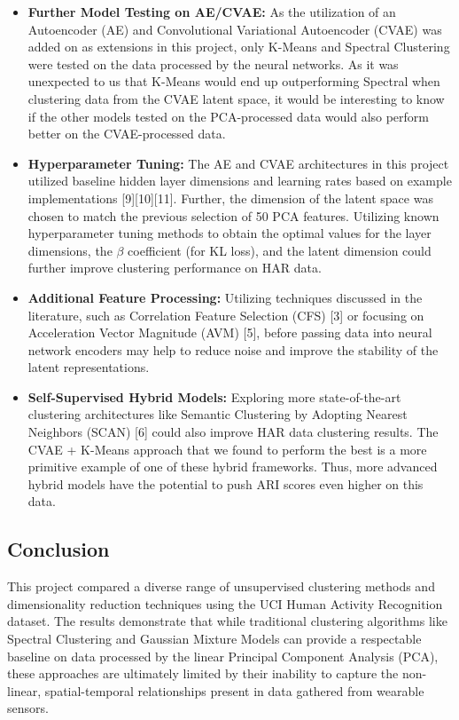 \documentclass[12pt]{IEEEtran}
\begin{document}
\begin{itemize}
    \item \textbf{Further Model Testing on AE/CVAE:} As the utilization of an Autoencoder (AE) and Convolutional Variational Autoencoder (CVAE) was added on as extensions in this project, only K-Means and Spectral Clustering were tested on the data processed by the neural networks. As it was unexpected to us that K-Means would end up outperforming Spectral when clustering data from the CVAE latent space, it would be interesting to know if the other models tested on the PCA-processed data would also perform better on the CVAE-processed data.
    \item \textbf{Hyperparameter Tuning:} The AE and CVAE architectures in this project utilized baseline hidden layer dimensions and learning rates based on example implementations [9][10][11]. Further, the dimension of the latent space was chosen to match the previous selection of 50 PCA features. Utilizing known hyperparameter tuning methods to obtain the optimal values for the layer dimensions, the $\beta$ coefficient (for KL loss), and the latent dimension could further improve clustering performance on HAR data.
    \item \textbf{Additional Feature Processing:} Utilizing techniques discussed in the literature, such as Correlation Feature Selection (CFS) [3] or focusing on Acceleration Vector Magnitude (AVM) [5], before passing data into neural network encoders may help to reduce noise and improve the stability of the latent representations.
    \item \textbf{Self-Supervised Hybrid Models:} Exploring more state-of-the-art clustering architectures like Semantic Clustering by Adopting Nearest Neighbors (SCAN) [6] could also improve HAR data clustering results. The CVAE + K-Means approach that we found to perform the best is a more primitive example of one of these hybrid frameworks. Thus, more advanced hybrid models have the potential to push ARI scores even higher on this data.
\end{itemize}

\subsection{Conclusion}

This project compared a diverse range of unsupervised clustering methods and dimensionality reduction techniques using the UCI Human Activity Recognition dataset. The results demonstrate that while traditional clustering algorithms like Spectral Clustering and Gaussian Mixture Models can provide a respectable baseline on data processed by the linear Principal Component Analysis (PCA), these approaches are ultimately limited by their inability to capture the non-linear, spatial-temporal relationships present in data gathered from wearable sensors.
\end{document}
